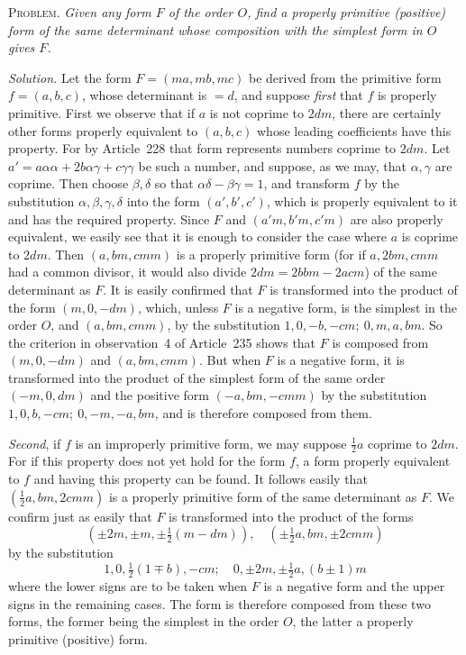 \textsc{Problem.} \textit{Given any form $F$ of the order $O$, find a properly primitive (positive) form of the same determinant whose composition with the simplest form in $O$ gives $F$.}

\textit{Solution.} Let the form $F=(ma,mb,mc)$ be derived from the primitive form $f=(a,b,c)$, whose determinant is $=d$, and suppose \textit{first} that $f$ is properly primitive. First we observe that if $a$ is not coprime to $2dm$, there are certainly other forms properly equivalent to $(a,b,c)$ whose leading coefficients have this property. For by Article~228 that form represents numbers coprime to $2dm$. Let $a'=a\alpha\alpha+2b\alpha\gamma+c\gamma\gamma$ be such a number, and suppose, as we may, that $\alpha,\gamma$ are coprime. Then choose $\beta,\delta$ so that $\alpha\delta-\beta\gamma=1$, and transform $f$ by the substitution $\alpha,\beta,\gamma,\delta$ into the form $(a',b',c')$, which is properly equivalent to it and has the required property. Since $F$ and $(a'm,b'm,c'm)$ are also properly equivalent, we easily see that it is enough to consider the case where $a$ is coprime to $2dm$. Then $(a,bm,cmm)$ is a properly primitive form (for if $a,2bm,cmm$ had a common divisor, it would also divide $2dm=2bbm-2acm$) of the same determinant as $F$. It is easily confirmed that $F$ is transformed into the product of the form $(m,0,-dm)$, which, unless $F$ is a negative form, is the simplest in the order $O$, and $(a,bm,cmm)$, by the substitution $1,0,-b,-cm;\ 0,m,a,bm$. So the criterion in observation~4 of Article~235 shows that $F$ is composed from $(m,0,-dm)$ and $(a,bm,cmm)$. But when $F$ is a negative form, it is transformed into the product of the simplest form of the same order $(-m,0,dm)$ and the positive form $(-a,bm,-cmm)$ by the substitution $1,0,b,-cm;\ 0,-m,-a,bm$, and is therefore composed from them.

\textit{Second}, if $f$ is an improperly primitive form, we may suppose $\frac{1}{2}a$ coprime to $2dm$. For if this property does not yet hold for the form $f$, a form properly equivalent to $f$ and having this property can be found. It follows easily that $(\frac{1}{2}a,bm,2cmm)$ is a properly primitive form of the same determinant as $F$. We confirm just as easily that $F$ is transformed into the product of the forms
\[
(\pm2m,\pm m,\pm\tfrac{1}{2}(m-dm)),\quad
(\pm\tfrac{1}{2}a,bm,\pm2cmm)
\]
by the substitution
\[
1,0,\tfrac{1}{2}(1\mp b),-cm;\quad 0,\pm2m,\pm\tfrac{1}{2}a,(b\pm1)m
\]
where the lower signs are to be taken when $F$ is a negative form and the upper signs in the remaining cases. The form is therefore composed from these two forms, the former being the simplest in the order $O$, the latter a properly primitive (positive) form.

